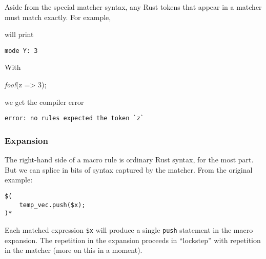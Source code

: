 \documentclass[a4paper,]{book}
\newenvironment{Shaded}{\begin{snugshade}}{\end{snugshade}}
\newcommand{\KeywordTok}[1]{\textcolor[rgb]{0.13,0.29,0.53}{\textbf{{#1}}}}
\newcommand{\DecValTok}[1]{\textcolor[rgb]{0.00,0.00,0.81}{{#1}}}
\newcommand{\StringTok}[1]{\textcolor[rgb]{0.31,0.60,0.02}{{#1}}}
\newcommand{\PreprocessorTok}[1]{\textcolor[rgb]{0.56,0.35,0.01}{\textit{{#1}}}}
\newcommand{\NormalTok}[1]{{#1}}
\begin{document}
Aside from the special matcher syntax, any Rust tokens that appear in a
matcher must match exactly. For example,

\begin{Shaded}
\end{Shaded}

will print

\begin{verbatim}
mode Y: 3
\end{verbatim}

With

\begin{Shaded}
\begin{Highlighting}[]
\PreprocessorTok{foo!}\NormalTok{(z => }\DecValTok{3}\NormalTok{);}
\end{Highlighting}
\end{Shaded}

we get the compiler error

\begin{verbatim}
error: no rules expected the token `z`
\end{verbatim}

\subsubsection{Expansion}\label{expansion}

The right-hand side of a macro rule is ordinary Rust syntax, for the
most part. But we can splice in bits of syntax captured by the matcher.
From the original example:

\begin{verbatim}
$(
    temp_vec.push($x);
)*
\end{verbatim}

Each matched expression \texttt{\$x} will produce a single \texttt{push}
statement in the macro expansion. The repetition in the expansion
proceeds in ``lockstep'' with repetition in the matcher (more on this in
a moment).
\end{document}
